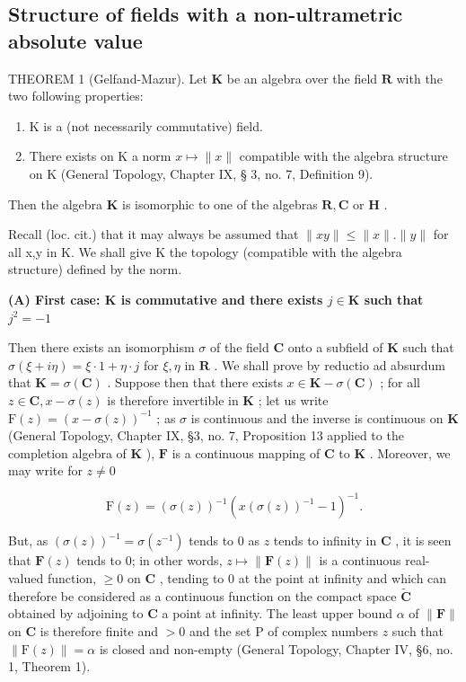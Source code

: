 \subsection{Structure of fields with a non-ultrametric absolute value}

THEOREM 1 (Gelfand-Mazur). Let \(\mathbf{K}\) be an algebra over the field \(\mathbf{R}\) with the two following properties:

\begin{enumerate}
\def\labelenumi{(\arabic{enumi})}
\item
  K is a (not necessarily commutative) field.
\item
  There exists on K a norm \(x \mapsto \| x \|\) compatible with the algebra structure on K (General Topology, Chapter IX, § 3, no. 7, Definition 9).
\end{enumerate}

Then the algebra \(\mathbf{K}\) is isomorphic to one of the algebras \(\mathbf{R},\mathbf{C}\) or \(\mathbf{H}\) .

Recall (loc. cit.) that it may always be assumed that \(\|xy\|\leqslant\|x\|. \|y\|\) for all x,y in K. We shall give K the topology (compatible with the algebra structure) defined by the norm.

\textbf{(A) First case: \(\mathbf{K}\) is commutative and there exists \(j\in \mathbf{K}\) such that \(j^2 = -1\)}\par

Then there exists an isomorphism \(\sigma\) of the field \(\mathbf{C}\) onto a subfield of \(\mathbf{K}\) such that \(\sigma(\xi + i\eta) = \xi \cdot 1 + \eta \cdot j\) for \(\xi, \eta\) in \(\mathbf{R}\) . We shall prove by reductio ad absurdum that \(\mathbf{K} = \sigma(\mathbf{C})\) . Suppose then that there exists \(x \in \mathbf{K} - \sigma(\mathbf{C})\) ; for all \(z \in \mathbf{C}, x - \sigma(z)\) is therefore invertible in \(\mathbf{K}\) ; let us write \(\mathrm{F}(z) = (x - \sigma(z))^{-1}\) ; as \(\sigma\) is continuous and the inverse is continuous on \(\mathbf{K}\) (General Topology, Chapter IX, §3, no. 7, Proposition 13 applied to the completion algebra of \(\mathbf{K}\) ), \(\mathbf{F}\) is a continuous mapping of \(\mathbf{C}\) to \(\mathbf{K}\) . Moreover, we may write for \(z \neq 0\)

\[
\mathrm{F} (z) = (\sigma (z)) ^ {- 1} (x (\sigma (z)) ^ {- 1} - 1) ^ {- 1}.
\]

But, as \((\sigma(z))^{-1} = \sigma(z^{-1})\) tends to 0 as \(z\) tends to infinity in \(\mathbf{C}\) , it is seen that \(\mathbf{F}(z)\) tends to 0; in other words, \(z \mapsto \| \mathbf{F}(z) \|\) is a continuous real-valued function, \(\geqslant 0\) on \(\mathbf{C}\) , tending to 0 at the point at infinity and which can therefore be considered as a continuous function on the compact space \(\tilde{\mathbf{C}}\) obtained by adjoining to \(\mathbf{C}\) a point at infinity. The least upper bound \(\alpha\) of \(\| \mathbf{F} \|\) on \(\mathbf{C}\) is therefore finite and \(>0\) and the set \(\mathrm{P}\) of complex numbers \(z\) such that \(\| \mathrm{F}(z) \| = \alpha\) is closed and non-empty (General Topology, Chapter IV, §6, no. 1, Theorem 1).

